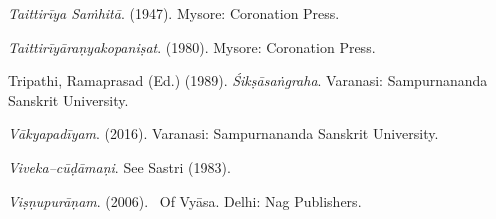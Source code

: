 \begin{thebibliography}{99}
 \item \textit{Taittirīya Saṁhitā}. (1947). Mysore: Coronation Press.

 \item \textit{Taittirīyāraṇyakopaniṣat}. (1980). Mysore: Coronation Press. 

 \item Tripathi, Ramaprasad (Ed.) (1989). \textit{Śikṣāsaṅgraha}. Varanasi: Sampurnananda Sanskrit University. 

 \item \textit{Vākyapadīyam}. (2016). Varanasi: Sampurnananda Sanskrit University.

 \item \textit{Viveka–cūḍāmaṇi}. See Sastri (1983).

 \item \textit{Viṣṇupurāṇam}. (2006).  Of Vyāsa. Delhi: Nag Publishers. \\

 \end{thebibliography}

